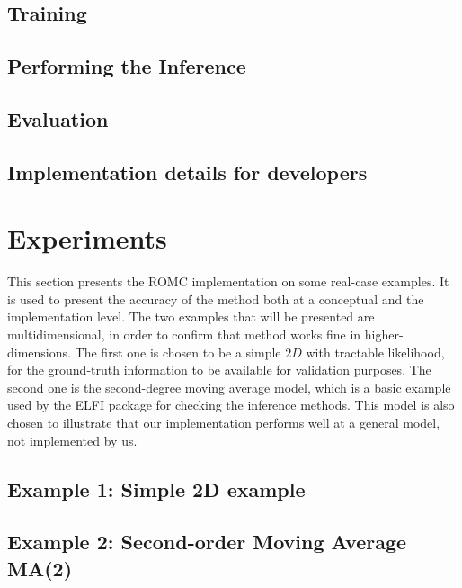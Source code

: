 \documentclass[11pt,twoside]{article}
\numberwithin{Theorem}{section}
\numberwithin{Definition}{section}
\numberwithin{Lemma}{section}
\numberwithin{Algorithm}{section}
\numberwithin{equation}{section}
\begin{document}
\subsection{Training}
\label{subsec:training}


\subsection{Performing the Inference}
\label{subsec:inference}


\subsection{Evaluation}
\label{subsec:evaluation}


\subsection{Implementation details for developers}
\label{subsec:developers}

\clearpage


\section{Experiments}
This section presents the ROMC implementation on some real-case
examples. It is used to present the accuracy of the method both at a
conceptual and the implementation level. The two examples that will be
presented are multidimensional, in order to confirm that method works
fine in higher-dimensions. The first one is chosen to be a simple $2D$
with tractable likelihood, for the ground-truth information to be
available for validation purposes. The second one is the second-degree
moving average model, which is a basic example used by the ELFI
package for checking the inference methods. This model is also chosen
to illustrate that our implementation performs well at a general
model, not implemented by us.

\subsection{Example 1: Simple 2D example}
\label{subsec:ex1}


\subsection{Example 2: Second-order Moving Average MA(2)}
\label{subsec:ma2}

\end{document}
